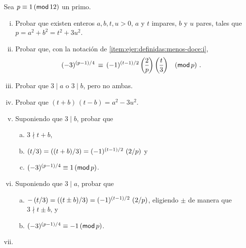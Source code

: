 \begin{ejerDefinidas}\label{ejer:definidas:menos-doce}
	Sea $p\equiv 1\tmodulo[12]$ un primo.
	\begin{enumerate}[(i)]
		\item\label{item:ejer:definidas:menos-doce:i}
			Probar que existen enteros $a,b,t,u>0$,
			$a$ y $t$ impares, $b$ y $u$ pares, tales que
			$p=a^2+b^2=t^2+3u^2$.
		\item\label{item:ejer:definidas:menos-doce:ii}
			Probar que, con la notaci\'on de
			\eqref{item:ejer:definidas:menos-doce:i},
			\begin{displaymath}
				(-3)^{(p-1)/4}\,\equiv\,
					(-1)^{(t-1)/2}\,\legendre 2 p\,
						\legendre t 3
						\modulo[p]
				\dispstop
			\end{displaymath}
		\item\label{item:ejer:definidas:menos-doce:iii}
			Probar que $3\mid a$ o $3\mid b$, pero no ambas.
		\item\label{item:ejer:definidas:menos-doce:iv}
			Probar que $(t+b)\,(t-b)=a^2-3u^2$.
		\item\label{item:ejer:definidas:menos-doce:v}
			Suponiendo que $3\mid b$, probar que
			\begin{enumerate}[(a)]
				\item $3\nmid t+b$,
				\item
					\begin{math}
						\tlegendre t 3 =
						\tlegendre{(t+b)} 3=
						(-1)^{(t-1)/2}\,\tlegendre 2 p
					\end{math} y
				\item $(-3)^{(p-1)/4}\equiv 1\tmodulo[p]$.
			\end{enumerate}
		\item\label{item:ejer:definidas:menos-doce:vi}
			Suponiendo que $3\mid a$, probar que
			\begin{enumerate}[(a)]
				\item
					\begin{math}
						-\tlegendre t 3=
						\tlegendre{(t\pm b)} 3=
						(-1)^{(t-1)/2}\,\tlegendre 2 p
					\end{math},
					eligiendo $\pm$ de manera que
					$3\nmid t\pm b$, y
				\item $(-3)^{(p-1)/4}\equiv -1\tmodulo[p]$.
			\end{enumerate}
		\item\label{item:ejer:definidas:menos-doce:vii}

\end{enumerate}
\end{ejerDefinidas}
